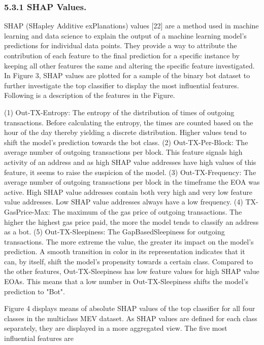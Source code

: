 \subsubsection*{5.3.1 SHAP Values.} SHAP (SHapley Additive exPlanations) values [22] are a method used in machine learning and data science to explain the output of a machine learning model's predictions for individual data points. They provide a way to attribute the contribution of each feature to the final prediction for a specific instance by keeping all other features the same and altering the specific feature investigated. In Figure 3, SHAP values are plotted for a sample of the binary bot dataset to further investigate the top classifier to display the most influential features. Following is a description of the features in the Figure.

(1) Out-TX-Entropy: The entropy of the distribution of times of outgoing transactions. Before calculating the entropy, the times are counted based on the hour of the day thereby yielding a discrete distribution. Higher values tend to shift the model's prediction towards the bot class.
(2) Out-TX-Per-Block: The average number of outgoing transactions per block. This feature signals high activity of an address and as high SHAP value addresses have high values of this feature, it seems to raise the suspicion of the model.
(3) Out-TX-Frequency: The average number of outgoing transactions per block in the timeframe the EOA was active. High SHAP value addresses contain both very high and very low feature value addresses. Low SHAP value addresses always have a low frequency.
(4) TX-GasPrice-Max: The maximum of the gas price of outgoing transactions. The higher the highest gas price paid, the more the model tends to classify an address as a bot.
(5) Out-TX-Sleepiness: The GapBasedSleepiness for outgoing transactions. The more extreme the value, the greater its impact on the model's prediction. A smooth transition in color in its representation indicates that it can, by itself, shift the model's propensity towards a certain class. Compared to the other features, Out-TX-Sleepiness has low feature values for high SHAP value EOAs. This means that a low number in Out-TX-Sleepiness shifts the model's prediction to "Bot".

Figure 4 displays means of absolute SHAP values of the top classifier for all four classes in the multiclass MEV dataset. As SHAP values are defined for each class separately, they are displayed in a more aggregated view. The five most influential features are

